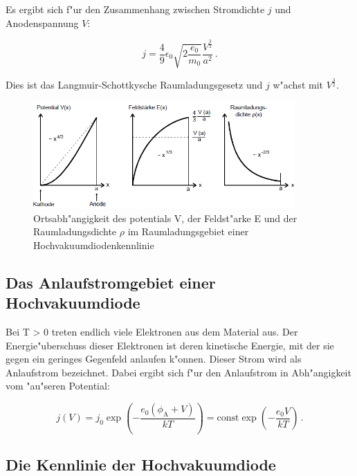 Es ergibt sich f"ur den Zusammenhang zwischen Stromdichte $j$ und Anodenspannung $V$:

\begin{equation}
	j = \frac{4}{9} \epsilon_\mathrm{0} \sqrt{2 \frac{e_\mathrm{0}}{m_\mathrm{0}}} \frac{V^\frac{3}{2}}{a^2} \, .
\end{equation}

Dies ist das Langmuir-Schottkysche Raumladungsgesetz und $j$ w"achst mit $V^\frac{3}{2}$.

\begin{figure}[!h]
	\centering
	\includegraphics[width = 10cm]{img/schott.PNG}
	\caption{Ortsabh"angigkeit des potentials V, der Feldst"arke E und der Raumladungsdichte $\rho$ im Raumladungsgebiet einer Hochvakuumdiodenkennlinie}
	\label{schott}
\end{figure}

\subsection{Das Anlaufstromgebiet einer Hochvakuumdiode} %
\label{sub:das_anlaufstromgebiet_einer_hochvakuumdiode}

Bei T > 0 treten endlich viele Elektronen aus dem Material aus. Der Energie"uberschuss dieser Elektronen ist deren kinetische Energie, mit der sie gegen ein geringes Gegenfeld anlaufen k"onnen.
Dieser Strom wird als Anlaufstrom bezeichnet.
Dabei ergibt sich f"ur den Anlaufstrom in Abh"angigkeit vom "au"seren Potential:

\begin{equation}
	j(V) = j_\mathrm{0} \exp{ \left( -\frac{e_\mathrm{0} (\phi_\mathrm{A} + V)}{kT} \right)} = \mathrm{const} \exp{ \left( -\frac{e_\mathrm{0}V}{kT} \right)}\, .
\end{equation}

\subsection{Die Kennlinie der Hochvakuumdiode} %
\label{sub:die_kennlinie_der_hochvakuumdiode}

